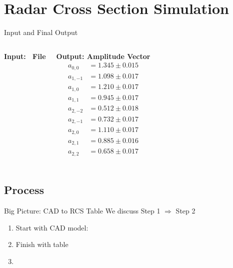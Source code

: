 % 

\section{Radar Cross Section Simulation}

\begin{frame}{Input and Final Output}
    \begin{columns}[T] %
        \textbf{Input: \obj \ File}
        \lstset{style=obj}

        \textbf{Output: Amplitude Vector}
        \[
        \begin{aligned}
        a_{0,0}  &= 1.345 \pm 0.015 \\
        a_{1,-1} &= 1.098 \pm 0.017 \\
        a_{1,0}  &= 1.210 \pm 0.017 \\
        a_{1,1}  &= 0.945 \pm 0.017 \\
        a_{2,-2} &= 0.512 \pm 0.018 \\
        a_{2,-1} &= 0.732 \pm 0.017 \\
        a_{2,0}  &= 1.110 \pm 0.017 \\
        a_{2,1}  &= 0.885 \pm 0.016 \\
        a_{2,2}  &= 0.658 \pm 0.017 \\
        \end{aligned}
        \]
    \end{columns}
\end{frame}

\subsection{Process}
\begin{frame}{Big Picture: CAD to RCS Table}
We discuss Step 1 $\Rightarrow$ Step 2
\begin{enumerate}
	\item Start with CAD model: \stl
	\item Finish with table 
	\item {}
\end{enumerate}
\end{frame}

